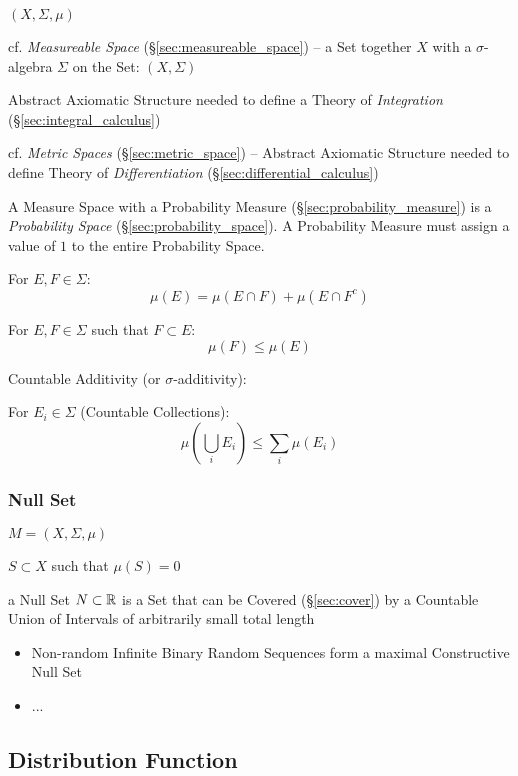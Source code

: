$(X,\Sigma,\mu)$

\fist cf. \emph{Measureable Space} (\S\ref{sec:measureable_space}) -- a Set
together $X$ with a $\sigma$-algebra $\Sigma$ on the Set: $(X,\Sigma)$

Abstract Axiomatic Structure needed to define a Theory of \emph{Integration}
(\S\ref{sec:integral_calculus})

cf. \emph{Metric Spaces} (\S\ref{sec:metric_space}) -- Abstract Axiomatic
Structure needed to define Theory of \emph{Differentiation}
(\S\ref{sec:differential_calculus})

A Measure Space with a Probability Measure (\S\ref{sec:probability_measure}) is
a \emph{Probability Space} (\S\ref{sec:probability_space}). A Probability
Measure must assign a value of $1$ to the entire Probability Space.

For $E,F \in \Sigma$:
\[
  \mu(E) = \mu(E \cap F) + \mu(E \cap F^c)
\]

For $E,F \in \Sigma$ such that $F \subset E$:
\[
  \mu(F) \leq \mu(E)
\]

Countable Additivity (or $\sigma$-additivity): %

For $E_i \in \Sigma$ (Countable Collections):
\[
  \mu(\bigcup_i E_i) \leq \sum_i \mu(E_i)
\]



\subsubsection{Null Set}\label{sec:null_set}\hfill

$M = (X, \Sigma, \mu)$

$S \subset X$ such that $\mu(S) = 0$

a Null Set $N \subset \mathbb{R}$ is a Set that can be Covered (\S\ref{sec:cover})
by a Countable Union of Intervals of arbitrarily small total length

\begin{itemize}
  \item Non-random Infinite Binary Random Sequences form a maximal Constructive
    Null Set
  \item ...
\end{itemize}



\subsection{Distribution Function}\label{sec:distribution_function}

